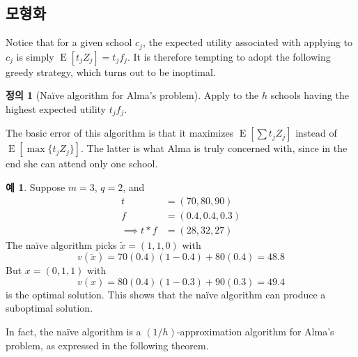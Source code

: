 \documentclass[12pt]{article} %
\newif\ifEN
\theoremstyle{definition}
\newtheorem{example}{Example}
\newtheorem{definition}{Definition}
\theoremstyle{definition}
\newtheorem{example}{예}
\newtheorem{definition}{정의}
\begin{document}
\ifEN \subsection{Approximation properties of a na\"ive solution}  \else \subsection{모형화} \fi
Notice that for a given school $c_j$, the expected utility associated with applying to $c_j$ is simply $\operatorname{E}[t_j Z_j] = t_j f_j$. It is therefore tempting to adopt the following greedy strategy, which turns out to be inoptimal.
\begin{definition}[Na\"ive algorithm for Alma’s problem] \label{naivealgorithm}
Apply to the $h$ schools having the highest expected utility $t_j f_j$.
\end{definition}
The basic error of this algorithm is that it maximizes $\operatorname{E}\left[\sum t_j Z_j \right]$ instead of $\operatorname{E}\left[\max \{t_j Z_j\} \right]$. The latter is what Alma is truly concerned with, since in the end she can attend only one school.
\begin{example}
Suppose $m=3$, $q=2$, and
\begin{align*}
t &= (70, 80, 90) \\
f &= (0.4, 0.4, 0.3) \\
\implies t * f &= (28, 32, 27)
\end{align*}
The na\"ive algorithm picks $\tilde x = (1, 1, 0)$ with 
\[v(\tilde x) = 70(0.4)(1-0.4) + 80(0.4) = 48.8\]
But $x = (0, 1, 1)$ with
\[v(x) = 80(0.4)(1-0.3) + 90(0.3) = 49.4\]
is the optimal solution. This shows that the na\"ive algorithm can produce a suboptimal solution.
\end{example}

In fact, the na\"ive algorithm is a $(1/h)$-approximation algorithm for Alma’s problem, as expressed in the following theorem.
\end{document}
